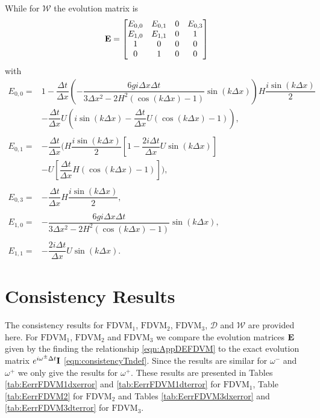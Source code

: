 While for $\mathcal{W}$ the evolution matrix is 
\begin{equation}
\label{eqn:AppEvolW}
\mathbf{E} = \begin{bmatrix}
{E}_{0,0} & {E}_{0,1} & 0 & E_{0,3} \\
{E}_{1,0} & E_{1,1} &0 & 1 \\
1&0&0&0\\
0&1&0&0
\end{bmatrix}
\end{equation}
with
\begin{align*}
{E}_{0,0} = &1 - \dfrac{\Delta t}{\Delta x}\left(-\dfrac{6 gi \Delta x\Delta t}{3 \Delta x^2 -2{H^2} \left( \cos\left(k \Delta x\right) - 1 \right)}{ \sin\left(k \Delta x\right)}\right)H\dfrac{i\sin\left(k\Delta x\right)}{2} \\  & - \dfrac{\Delta t}{\Delta x}U\left(i\sin\left(k\Delta x\right) - \dfrac{\Delta t}{\Delta x}U\left(\cos\left(k\Delta x\right) - 1\right)\right), \\ \\
{E}_{0,1} = &- \dfrac{\Delta t}{\Delta x} \Bigg(H\dfrac{i\sin\left(k\Delta x\right)}{2}\left[ 1 -\dfrac{2i \Delta t }{\Delta x} U \sin\left(k \Delta x\right) \right] \\ & -U\left[\dfrac{\Delta t}{\Delta x}H\left(\cos\left(k\Delta x\right) - 1\right)\right] \Bigg),\\ \\
E_{0,3} = &- \dfrac{\Delta t}{\Delta x}H\dfrac{i\sin\left(k\Delta x\right)}{2},  \\ \\
 {E}_{1,0} = &-\dfrac{6 gi \Delta x\Delta t}{3 \Delta x^2 -2{H^2} \left( \cos\left(k \Delta x\right) - 1 \right)}{ \sin\left(k \Delta x\right)}, \\ \\
{E}_{1,1} = &-\dfrac{2i \Delta t }{\Delta x} U \sin\left(k \Delta x\right).
\end{align*}

\section{Consistency Results}
The consistency results for $\text{FDVM}_1$, $\text{FDVM}_2$, $\text{FDVM}_3$, $\mathcal{D}$ and $\mathcal{W}$ are provided here. For $\text{FDVM}_1$, $\text{FDVM}_2$ and $\text{FDVM}_3$ we compare the evolution matrices $\mathbf{E}$ given by the finding the relationship \eqref{eqn:AppDEFDVM} to the exact evolution matrix $e^{i\omega^\pm \Delta t } \mathbf{I}$ \eqref{eqn:consistencyTndef}. Since the results are similar for $\omega^-$ and $\omega^+$ we only give the results for $\omega^+$. These results are presented in Tables \ref{tab:EerrFDVM1dxerror} and \ref{tab:EerrFDVM1dterror} for $\text{FDVM}_1$, Table \ref{tab:EerrFDVM2} for $\text{FDVM}_2$ and Tables \ref{tab:EerrFDVM3dxerror} and \ref{tab:EerrFDVM3dterror} for $\text{FDVM}_3$.

